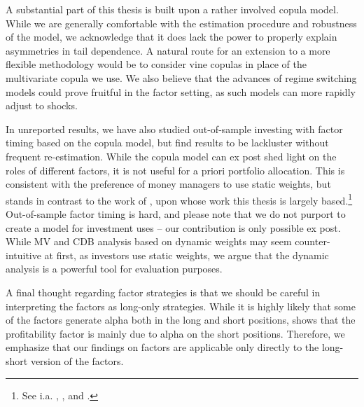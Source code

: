 A substantial part of this thesis is built upon a rather involved copula model. While we are generally comfortable with the estimation procedure and robustness of the model, we acknowledge that it does lack the power to properly explain asymmetries in tail dependence. A natural route for an extension to a more flexible methodology would be to consider vine copulas in place of the multivariate copula we use. We also believe that the advances of regime switching models could prove fruitful in the factor setting, as such models can more rapidly adjust to shocks.

In unreported results, we have also studied out-of-sample investing with factor timing based on the copula model, but find results to be lackluster without frequent re-estimation. While the copula model can ex post shed light on the roles of different factors, it is not useful for a priori portfolio allocation. This is consistent with the preference of money managers to use static weights, but stands in contrast to the work of \textcite{ChristoffersenLanglois2013}, upon whose work this thesis is largely based.\footnote{See i.a. \textcite{AQRSiren}, \textcite{BlackRock}, \textcite{MSCI} and \textcite{Robeco}.} Out-of-sample factor timing is hard, and please note that we do not purport to create a model for investment uses -- our contribution is only possible ex post. While MV and CDB analysis based on dynamic weights may seem counter-intuitive at first, as investors use static weights, we argue that the dynamic analysis is a powerful tool for evaluation purposes.

A final thought regarding factor strategies is that we should be careful in interpreting the factors as long-only strategies. While it is highly likely that some of the factors generate alpha both in the long and short positions, \textcite{Wang2013} shows that the profitability factor is mainly due to alpha on the short positions. Therefore, we emphasize that our findings on factors are applicable only directly to the long-short version of the factors.
